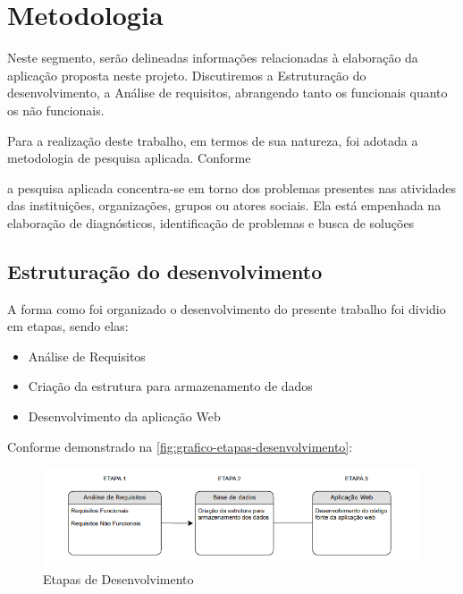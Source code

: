 \chapter{Metodologia}
Neste segmento, serão delineadas informações relacionadas à elaboração da aplicação proposta neste projeto. Discutiremos a Estruturação do desenvolvimento, a Análise de requisitos, abrangendo tanto os funcionais quanto os não funcionais.

Para a realização deste trabalho, em termos de sua natureza, foi adotada a metodologia de pesquisa aplicada. Conforme \begin{citacao}
	\cite{fleury2016pesquisa}
	a pesquisa aplicada concentra-se em torno dos problemas presentes nas atividades das instituições, organizações, grupos ou atores sociais. Ela está empenhada na elaboração de 
    diagnósticos, identificação de problemas e busca de soluções
\end{citacao} 

\section{Estruturação do desenvolvimento}
A forma como foi organizado o desenvolvimento do presente trabalho foi dividio em etapas, sendo elas:
\begin{itemize}
	\item Análise de Requisitos
	\item Criação da estrutura para armazenamento de dados
	\item Desenvolvimento da aplicação Web
\end{itemize}

Conforme demonstrado na \autoref{fig:grafico-etapas-desenvolvimento}:

\begin{figure}[htb]
    \caption{\label{fig:grafico-etapas-desenvolvimento}Etapas de Desenvolvimento}
    \begin{center}
        \includegraphics[scale=0.9]{imagens/estagios-de-desenvolvimento.png}
    \end{center}
\end{figure}


